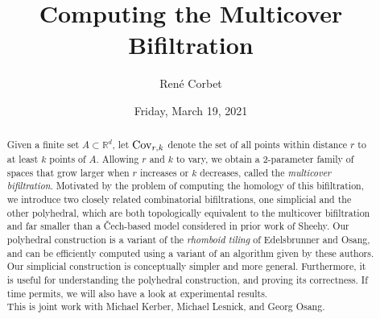 \documentclass{UAmathtalk}
\author{Ren\'{e} Corbet}
\title{Computing the Multicover Bifiltration}
\date{Friday, March 19, 2021}
\begin{document}
\maketitle

%

\begin{abstract}
Given a finite set $A\subset\mathbb{R}^d$, let $\textnormal{Cov}_{r,k}$ denote the set of all points within distance $r$ to at least $k$ points of $A$. Allowing $r$ and $k$ to vary, we obtain a 2-parameter family of spaces that grow larger when $r$ increases or $k$ decreases, called the \emph{multicover bifiltration}. Motivated by the problem of computing the homology of this bifiltration, we introduce two closely related combinatorial bifiltrations, one simplicial and the other polyhedral, which are both topologically equivalent to the multicover bifiltration and far smaller than a \v Cech-based model considered in prior work of Sheehy. Our polyhedral construction is a variant of the \emph{rhomboid tiling} of Edelsbrunner and Osang, and can be efficiently computed using a variant of an algorithm given by these authors. Our simplicial construction is conceptually simpler and more general. Furthermore, it is useful for understanding the polyhedral construction, and proving its correctness. If time permits, we will also have a look at experimental results. \\
This is joint work with Michael Kerber, Michael Lesnick, and Georg Osang.
\end{abstract}
\end{document}

